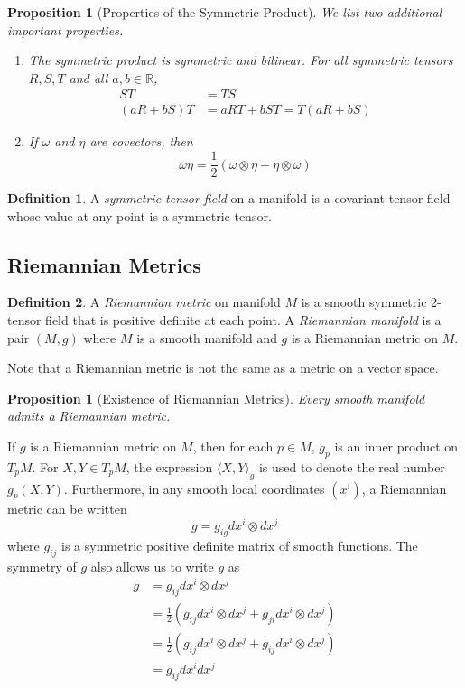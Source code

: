 \documentclass{article}
\newtheorem{proposition}[theorem]{Proposition}
\theoremstyle{remark}
\theoremstyle{definition}
\newtheorem{definition}{Definition}[section]
\begin{document}
    \begin{proposition}[Properties of the Symmetric Product]
    We list two additional important properties. 
    \begin{enumerate}
        \item The symmetric product is symmetric and bilinear. For all symmetric tensors $R, S, T$ and all $a, b \in \mathbb{R}$, 
        \begin{align*}
            ST & = TS \\
            (a R + b S) T & = a RT + b ST= T (a R + bS) 
        \end{align*}
        \item If $\omega$ and $\eta$ are covectors, then 
        \[\omega \eta = \frac{1}{2} (\omega \otimes \eta + \eta \otimes \omega)\]
    \end{enumerate}
    \end{proposition}

    \begin{definition}
    A \textit{symmetric tensor field} on a manifold is a covariant tensor field whose value at any point is a symmetric tensor. 
    \end{definition}

  \subsection{Riemannian Metrics}

    \begin{definition}
    A \textit{Riemannian metric} on manifold $M$ is a smooth symmetric 2-tensor field that is positive definite at each point. A \textit{Riemannian manifold} is a pair $(M, g)$ where $M$ is a smooth manifold and $g$ is a Riemannian metric on $M$. 
    \end{definition}

    Note that a Riemannian metric is not the same as a metric on a vector space. 

    \begin{proposition}[Existence of Riemannian Metrics]
    Every smooth manifold admits a Riemannian metric. 
    \end{proposition}

    If $g$ is a Riemannian metric on $M$, then for each $p \in M$, $g_p$ is an inner product on $T_p M$. For $X, Y \in T_p M$, the expression $\langle X, Y \rangle_g$ is used to denote the real number $g_p (X, Y)$. Furthermore, in any smooth local coordinates $(x^i)$, a Riemannian metric can be written 
    \[g = g_{i g} dx^i \otimes dx^j\]
    where $g_{ij}$ is a symmetric positive definite matrix of smooth functions. The symmetry of $g$ also allows us to write $g$ as 
    \begin{align*}
        g & = g_{ij} dx^i \otimes dx^j \\
        & = \frac{1}{2} (g_{ij} dx^i \otimes dx^j + g_{ji} dx^i \otimes dx^j) \\
        & = \frac{1}{2} (g_{ij} dx^i \otimes dx^j + g_{ij} dx^i \otimes dx^j) \\
        & = g_{ij} dx^i dx^j 
    \end{align*}
\end{document}
